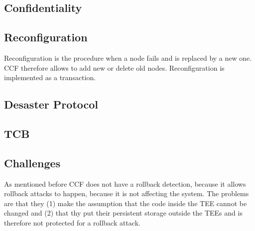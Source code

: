 \subsection{Confidentiality}
\subsection{Reconfiguration}
Reconfiguration is the procedure when a node fails and is replaced by a new one. CCF therefore allows to add new or delete old nodes. Reconfiguration is implemented as a transaction.
\subsection{Desaster Protocol}
\subsection{TCB}
\subsection{Challenges}
As mentioned before CCF does not have a rollback detection, because it allows rollback attacks to happen, because it is not affecting the system. The problems are that they (1) make the assumption that the code inside the TEE cannot be changed and (2) that thy put their persistent storage outside the TEEs and is therefore not protected for a rollback attack.